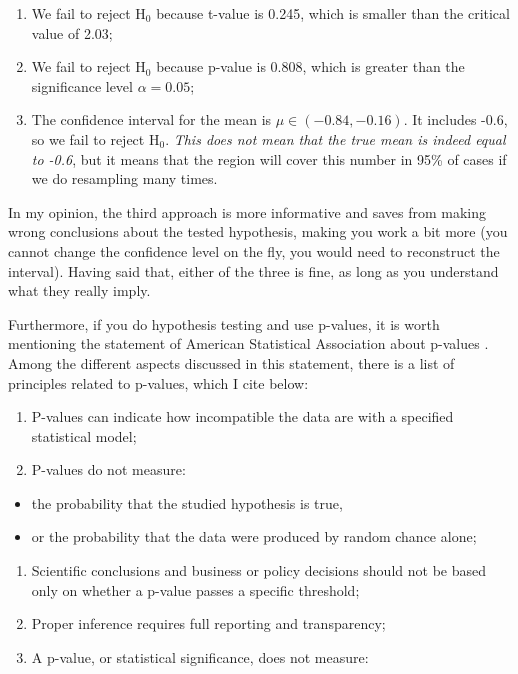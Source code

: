 \documentclass[
]{book}
\providecommand{\tightlist}{%
  \setlength{\itemsep}{0pt}\setlength{\parskip}{0pt}}
\theoremstyle{definition}
\theoremstyle{definition}
\theoremstyle{definition}
\theoremstyle{definition}
\theoremstyle{remark}
\begin{document}
\begin{enumerate}
\def\labelenumi{\arabic{enumi}.}
\tightlist
\item
  We fail to reject \(\mathrm{H}_0\) because t-value is 0.245, which is smaller than the critical value of 2.03;
\item
  We fail to reject \(\mathrm{H}_0\) because p-value is 0.808, which is greater than the significance level \(\alpha=0.05\);
\item
  The confidence interval for the mean is \(\mu \in (-0.84, -0.16)\). It includes -0.6, so we fail to reject \(\mathrm{H}_0\). \emph{This does not mean that the true mean is indeed equal to -0.6}, but it means that the region will cover this number in 95\% of cases if we do resampling many times.
\end{enumerate}

In my opinion, the third approach is more informative and saves from making wrong conclusions about the tested hypothesis, making you work a bit more (you cannot change the confidence level on the fly, you would need to reconstruct the interval). Having said that, either of the three is fine, as long as you understand what they really imply.

Furthermore, if you do hypothesis testing and use p-values, it is worth mentioning the statement of American Statistical Association about p-values \citep{Wasserstein2016}. Among the different aspects discussed in this statement, there is a list of principles related to p-values, which I cite below:

\begin{enumerate}
\def\labelenumi{\arabic{enumi}.}
\tightlist
\item
  P-values can indicate how incompatible the data are with a specified statistical model;
\item
  P-values do not measure:
\end{enumerate}

\begin{itemize}
\tightlist
\item
  the probability that the studied hypothesis is true,
\item
  or the probability that the data were produced by random chance alone;
\end{itemize}

\begin{enumerate}
\def\labelenumi{\arabic{enumi}.}
\setcounter{enumi}{2}
\tightlist
\item
  Scientific conclusions and business or policy decisions should not be based only on whether a p-value passes a specific threshold;
\item
  Proper inference requires full reporting and transparency;
\item
  A p-value, or statistical significance, does not measure:
\end{enumerate}
\end{document}
